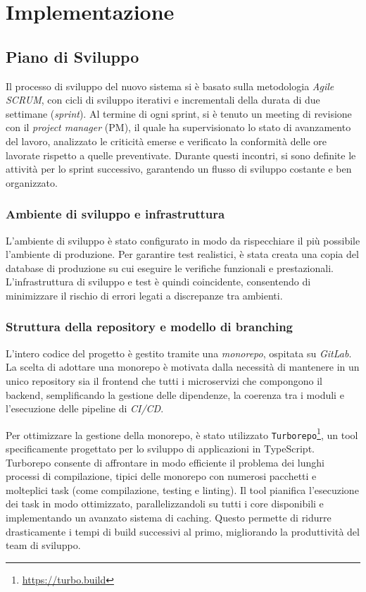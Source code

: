\chapter{Implementazione}

\section{Piano di Sviluppo}
Il processo di sviluppo del nuovo sistema si è basato sulla metodologia \textit{Agile SCRUM}, con cicli di sviluppo iterativi e incrementali della durata di due settimane (\textit{sprint}). Al termine di ogni sprint, si è tenuto un meeting di revisione con il \textit{project manager} (PM), il quale ha supervisionato lo stato di avanzamento del lavoro, analizzato le criticità emerse e verificato la conformità delle ore lavorate rispetto a quelle preventivate. Durante questi incontri, si sono definite le attività per lo sprint successivo, garantendo un flusso di sviluppo costante e ben organizzato.

\subsection{Ambiente di sviluppo e infrastruttura}
L'ambiente di sviluppo è stato configurato in modo da rispecchiare il più possibile l'ambiente di produzione. Per garantire test realistici, è stata creata una copia del database di produzione su cui eseguire le verifiche funzionali e prestazionali. L'infrastruttura di sviluppo e test è quindi coincidente, consentendo di minimizzare il rischio di errori legati a discrepanze tra ambienti.

\subsection{Struttura della repository e modello di branching}
L'intero codice del progetto è gestito tramite una \textit{monorepo}, ospitata su \textit{GitLab}. La scelta di adottare una monorepo è motivata dalla necessità di mantenere in un unico repository sia il frontend che tutti i microservizi che compongono il backend, semplificando la gestione delle dipendenze, la coerenza tra i moduli e l'esecuzione delle pipeline di \textit{CI/CD}.

Per ottimizzare la gestione della monorepo, è stato utilizzato \texttt{Turborepo}\footnote{\url{https://turbo.build}}, un tool specificamente progettato per lo sviluppo di applicazioni in TypeScript. Turborepo consente di affrontare in modo efficiente il problema dei lunghi processi di compilazione, tipici delle monorepo con numerosi pacchetti e molteplici task (come compilazione, testing e linting). Il tool pianifica l'esecuzione dei task in modo ottimizzato, parallelizzandoli su tutti i core disponibili e implementando un avanzato sistema di caching. Questo permette di ridurre drasticamente i tempi di build successivi al primo, migliorando la produttività del team di sviluppo.

